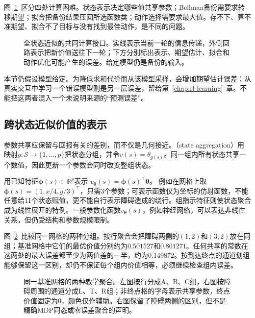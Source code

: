 图~\ref{fig:rl-planning-approximation-loop}~区分四处计算困难。状态表示决定哪些值共享参数；Bellman备份需要求转移期望；拟合把备份结果压回所选函数类；动作选择需要求最大值。存不下、算不准期望、拟合不了目标与没有找到最佳动作，是不同的问题。

\begin{figure}[htbp]
 \centering
 
 \caption{全状态近似的共同计算接口。实线表示当前一轮的信息传递，外侧回路表示把新价值送往下一轮；下方分别标出表示、期望估计、拟合和动作优化可能产生的误差。给定模型仍是备份的输入。}
 \label{fig:rl-planning-approximation-loop}
\end{figure}

本节仍假设模型给定。为降低求和代价而从该模型采样，会增加期望估计误差；从真实交互中学习一个错误模型则是另一层误差，留给第~\ref{chap:rl-learning}~章。不能把这两者混入一个未说明来源的“预测误差”。

\subsection{跨状态近似价值的表示}
\label{sec:rl-planning-representation}

参数共享应保留与回报有关的差别，而不仅是几何接近。（state aggregation）用映射$g:\mathcal S\to\{1,\ldots,p\}$把状态分组，并令$v(s)=\theta_{g(s)}$。同一组内所有状态共享一个数值，因此更新一个参数会同时改变整组状态。

用已知特征$\bm\phi(s)\in\mathbb R^p$表示
$v_{\bm\theta}(s)=\bm\phi(s)^\top\bm\theta$。
例如在网格上取$\bm\phi(s)=(1,x/4,y/3)^\top$，只需3个参数；可表示函数仅为坐标的仿射函数，不能任意给11个状态赋值，更不能自行表示障碍造成的绕行。组指示特征则使状态聚合成为线性展开的特例。一般参数化函数$v_{\bm\theta}(s)$，例如神经网络，可以表达非线性关系，但仍受结构和参数规模限制。

图~\ref{fig:rl-planning-aggregation}~比较同一网格的两种分组。按行聚合会把障碍两侧的$(1,2)$和$(3,2)$放在同组；基准网格中它们的最优价值分别约为$0.501527$和$0.801271$。任何共享的常数在这两处的最大误差都至少为两值差的一半，约为$0.149872$。按到达终点的通道划组能够保留这一区别，却仍不保证每个组内价值相等，必须继续检查组内误差。

\begin{figure}[htbp]
 \centering
 
 \caption{同一基准网格的两种教学聚合。左图按行分成A、B、C组，右图按障碍周围的通道分成L、T、R组；非终点格的字母表示共享参数，终点价值固定为0，颜色仅作辅助。右图保留了障碍两侧的区别，但不是精确MDP同态或零误差聚合的声明。}
 \label{fig:rl-planning-aggregation}
\end{figure}

